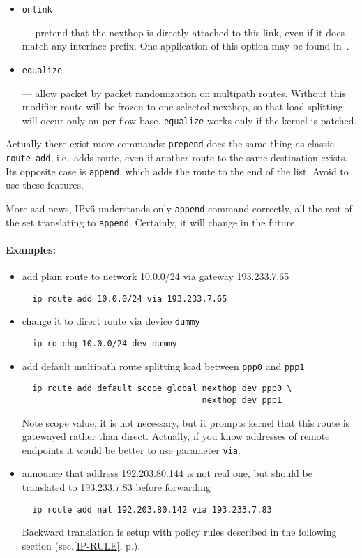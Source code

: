 \begin{itemize}
\item \verb|onlink|

--- pretend that the nexthop is directly attached to this link,
even if it does match any interface prefix. One application of this
option may be found in~\cite{IP-TUNNELS}.

\item \verb|equalize|

--- allow packet by packet randomization on multipath routes.
Without this modifier route will be frozen to one selected
nexthop, so that load splitting will occur only on per-flow base.
\verb|equalize| works only if the kernel is patched.


\end{itemize}


\begin{NB}
  Actually there exist more commands: \verb|prepend| does the same
  thing as classic \verb|route add|, i.e.\ adds route, even if another
  route to the same destination exists. Its opposite case is \verb|append|,
  which adds the route to the end of the list. Avoid to use these
  features.
\end{NB}
\begin{NB}
  More sad news, IPv6 understands only \verb|append| command correctly,
  all the rest of the set translating to \verb|append|. Certainly,
  it will change in the future.
\end{NB}

\paragraph{Examples:}
\begin{itemize}
\item add plain route to network 10.0.0/24 via gateway 193.233.7.65
\begin{verbatim}
  ip route add 10.0.0/24 via 193.233.7.65
\end{verbatim}
\item change it to direct route via device \verb|dummy|
\begin{verbatim}
  ip ro chg 10.0.0/24 dev dummy
\end{verbatim}
\item add default multipath route splitting load between \verb|ppp0|
and \verb|ppp1|
\begin{verbatim}
  ip route add default scope global nexthop dev ppp0 \
                                    nexthop dev ppp1
\end{verbatim}
Note scope value, it is not necessary, but it prompts kernel
that this route is gatewayed rather than direct. Actually, if you
know addresses of remote endpoints it would be better to use parameter
\verb|via|.
\item announce that address 192.203.80.144 is not real one, but
should be translated to 193.233.7.83 before forwarding
\begin{verbatim}
  ip route add nat 192.203.80.142 via 193.233.7.83
\end{verbatim}
Backward translation is setup with policy rules described
in the following section (sec.\ref{IP-RULE}, p.\pageref{IP-RULE}).
\end{itemize}


